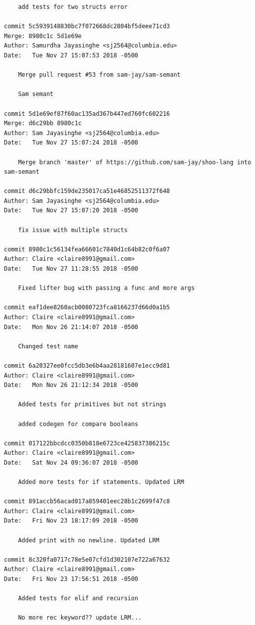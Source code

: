 \documentclass[12pt]{article}
\begin{document}
\begin{lstlisting}
    add tests for two structs error

commit 5c5939148830bc7f072668dc2804bf5deee71cd3
Merge: 8980c1c 5d1e69e
Author: Samurdha Jayasinghe <sj2564@columbia.edu>
Date:   Tue Nov 27 15:07:53 2018 -0500

    Merge pull request #53 from sam-jay/sam-semant
    
    Sam semant

commit 5d1e69ef87f60ac135ad367b447ed760fc602216
Merge: d6c29bb 8980c1c
Author: Sam Jayasinghe <sj2564@columbia.edu>
Date:   Tue Nov 27 15:07:24 2018 -0500

    Merge branch 'master' of https://github.com/sam-jay/shoo-lang into sam-semant

commit d6c29bbfc159de235017ca51e46852511372f648
Author: Sam Jayasinghe <sj2564@columbia.edu>
Date:   Tue Nov 27 15:07:20 2018 -0500

    fix issue with multiple structs

commit 8980c1c56134fea66601c7840d1c64b82c0f6a07
Author: Claire <claire8991@gmail.com>
Date:   Tue Nov 27 11:28:55 2018 -0500

    Fixed lifter bug with passing a func and more args

commit eaf1dee8260acb0080723fca8166237d66d0a1b5
Author: Claire <claire8991@gmail.com>
Date:   Mon Nov 26 21:14:07 2018 -0500

    Changed test name

commit 6a20327ee0fcc5db3e6b4aa28181607e1ecc9d81
Author: Claire <claire8991@gmail.com>
Date:   Mon Nov 26 21:12:34 2018 -0500

    Added tests for primitives but not strings
    
    added codegen for compare booleans

commit 017122bbcdcc0350b818e6723ce425837386215c
Author: Claire <claire8991@gmail.com>
Date:   Sat Nov 24 09:36:07 2018 -0500

    Added more tests for if statements. Updated LRM

commit 891accb56acad017a859401eec28b1c2699f47c8
Author: Claire <claire8991@gmail.com>
Date:   Fri Nov 23 18:17:09 2018 -0500

    Added print with no newline. Updated LRM

commit 8c320fa0717c78e5e07cfd1d302107e722a67632
Author: Claire <claire8991@gmail.com>
Date:   Fri Nov 23 17:56:51 2018 -0500

    Added tests for elif and recursion
    
    No more rec keyword?? update LRM...


\end{lstlisting}
\end{document}
